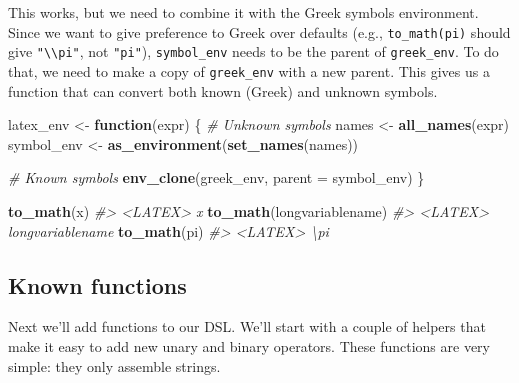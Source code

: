 \documentclass[]{book}
\newenvironment{Shaded}{\begin{snugshade}}{\end{snugshade}}
\newcommand{\CommentTok}[1]{\textcolor[rgb]{0.37,0.37,0.37}{\textit{#1}}}
\newcommand{\ControlFlowTok}[1]{\textcolor[rgb]{0.27,0.27,0.27}{\textbf{#1}}}
\newcommand{\DataTypeTok}[1]{\textcolor[rgb]{0.27,0.27,0.27}{#1}}
\newcommand{\KeywordTok}[1]{\textcolor[rgb]{0.27,0.27,0.27}{\textbf{#1}}}
\newcommand{\NormalTok}[1]{#1}
\newcommand{\StringTok}[1]{\textcolor[rgb]{0.5,0.5,0.5}{#1}}
\begin{document}
This works, but we need to combine it with the Greek symbols environment. Since we want to give preference to Greek over defaults (e.g., \texttt{to\_math(pi)} should give \texttt{"\textbackslash{}\textbackslash{}pi"}, not \texttt{"pi"}), \texttt{symbol\_env} needs to be the parent of \texttt{greek\_env}. To do that, we need to make a copy of \texttt{greek\_env} with a new parent. This gives us a function that can convert both known (Greek) and unknown symbols.

\begin{Shaded}
\begin{Highlighting}[]
\NormalTok{latex_env <-}\StringTok{ }\ControlFlowTok{function}\NormalTok{(expr) \{}
  \CommentTok{# Unknown symbols}
\NormalTok{  names <-}\StringTok{ }\KeywordTok{all_names}\NormalTok{(expr)}
\NormalTok{  symbol_env <-}\StringTok{ }\KeywordTok{as_environment}\NormalTok{(}\KeywordTok{set_names}\NormalTok{(names))}

  \CommentTok{# Known symbols}
  \KeywordTok{env_clone}\NormalTok{(greek_env, }\DataTypeTok{parent =}\NormalTok{ symbol_env)}
\NormalTok{\}}

\KeywordTok{to_math}\NormalTok{(x)}
\CommentTok{#> <LATEX> x}
\KeywordTok{to_math}\NormalTok{(longvariablename)}
\CommentTok{#> <LATEX> longvariablename}
\KeywordTok{to_math}\NormalTok{(pi)}
\CommentTok{#> <LATEX> \textbackslash{}pi}
\end{Highlighting}
\end{Shaded}

\hypertarget{known-functions}{%
\subsection{Known functions}\label{known-functions}}

Next we'll add functions to our DSL. We'll start with a couple of helpers that make it easy to add new unary and binary operators. These functions are very simple: they only assemble strings.
\end{document}
